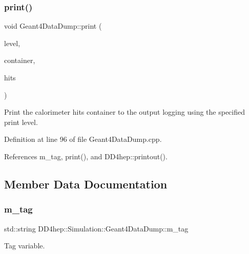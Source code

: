 \subsubsection{\texorpdfstring{print()}{print()}\hspace{0.1cm}{\footnotesize\ttfamily [6/6]}}
{\footnotesize\ttfamily void Geant4\+Data\+Dump\+::print (\begin{DoxyParamCaption}\item[{\hyperlink{namespace_d_d4hep_a5b5a64d56252469451f2020a27d57d42}{Print\+Level}}]{level,  }\item[{const std\+::string \&}]{container,  }\item[{const \hyperlink{class_d_d4hep_1_1_simulation_1_1_geant4_data_dump_a405c85a9a72c4f1dc0164d4a61d98f75}{Calorimeter\+Hits} $\ast$}]{hits }\end{DoxyParamCaption})}



Print the calorimeter hits container to the output logging using the specified print level. 



Definition at line 96 of file Geant4\+Data\+Dump.\+cpp.



References m\+\_\+tag, print(), and D\+D4hep\+::printout().



\subsection{Member Data Documentation}
\hypertarget{class_d_d4hep_1_1_simulation_1_1_geant4_data_dump_a58986bd9d08cd72f5d5b780d0047e5e6}{}\label{class_d_d4hep_1_1_simulation_1_1_geant4_data_dump_a58986bd9d08cd72f5d5b780d0047e5e6} 
\subsubsection{\texorpdfstring{m\+\_\+tag}{m\_tag}}
{\footnotesize\ttfamily std\+::string D\+D4hep\+::\+Simulation\+::\+Geant4\+Data\+Dump\+::m\+\_\+tag\hspace{0.3cm}{\ttfamily [protected]}}



Tag variable. 



